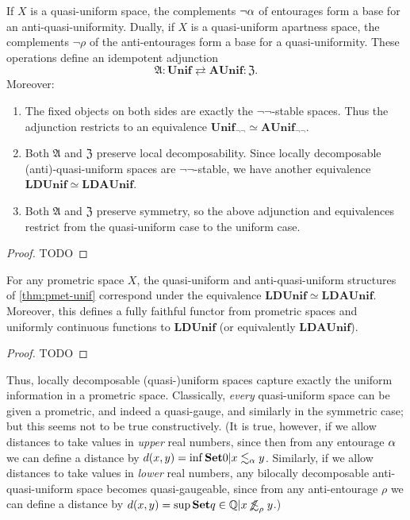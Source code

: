 \documentclass{article}
\def\oapt{\mathrel{\!\not\,\not\lesssim}}
\def\leapx{\lesssim}
\def\anti{\mathfrak{A}}
\def\neigh{\mathfrak{Z}}
\def\nn{\ensuremath{\neg\neg}}
\def\Unif{\mathbf{Unif}}
\def\Unifnn{\mathbf{Unif}_{\nn}}
\def\LDUnif{\mathbf{LDUnif}}
\def\AUnif{\mathbf{AUnif}}
\def\AUnifnn{\mathbf{AUnif}_{\nn}}
\def\LDAUnif{\mathbf{LDAUnif}}
\begin{document}
\begin{thm}
  If $X$ is a quasi-uniform space, the complements $\neg\alpha$ of entourages form a base for an anti-quasi-uniformity.
  Dually, if $X$ is a quasi-uniform apartness space, the complements $\neg\rho$ of the anti-entourages form a base for a quasi-uniformity.
  These operations define an idempotent adjunction
  \[ \anti : \Unif \rightleftarrows \AUnif : \neigh. \]
  Moreover:
  \begin{enumerate}
  \item The fixed objects on both sides are exactly the \nn-stable spaces.
    Thus the adjunction restricts to an equivalence $\Unifnn \simeq \AUnifnn$.
  \item Both $\anti$ and $\neigh$ preserve local decomposability.
    Since locally decomposable (anti)-quasi-uniform spaces are \nn-stable, we have another equivalence $\LDUnif \simeq \LDAUnif$.
  \item Both $\anti$ and $\neigh$ preserve symmetry, so the above adjunction and equivalences restrict from the quasi-uniform case to the uniform case.
  \end{enumerate}
\end{thm}
\begin{proof}
  TODO
\end{proof}

\begin{thm}
  For any prometric space $X$, the quasi-uniform and anti-quasi-uniform structures of \cref{thm:pmet-unif} correspond under the equivalence $\LDUnif \simeq \LDAUnif$.
  Moreover, this defines a fully faithful functor from prometric spaces and uniformly continuous functions to $\LDUnif$ (or equivalently $\LDAUnif$).
\end{thm}
\begin{proof}
  TODO
\end{proof}

Thus, locally decomposable (quasi-)uniform spaces capture exactly the uniform information in a prometric space.
Classically, \emph{every} quasi-uniform space can be given a prometric, and indeed a quasi-gauge, and similarly in the symmetric case; but this seems not to be true constructively.
(It is true, however, if we allow distances to take values in \emph{upper} real numbers, since then from any entourage $\alpha$ we can define a distance by $d(x,y) = \inf\setof{ 0 | x\leapx_\al y}$.
Similarly, if we allow distances to take values in \emph{lower} real numbers, any bilocally decomposable anti-quasi-uniform space becomes quasi-gaugeable, since from any anti-entourage $\rho$ we can define a distance by $d(x,y) = \sup\setof{ q\in\mathbb{Q} | x\oapt_\rho y }$.)
\end{document}
